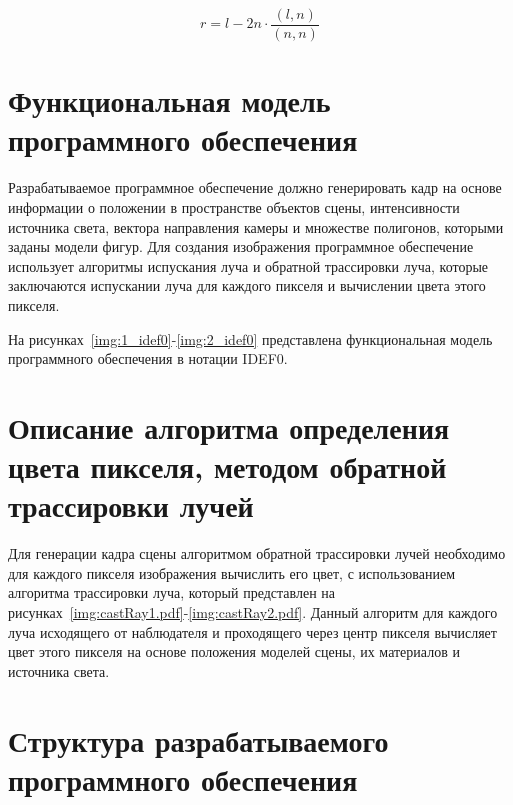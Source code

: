 \begin{equation}
	\label{reflect_ray}
	r = l - 2 n \cdot \frac{(l, n)}{(n, n)}
\end{equation}

\clearpage
\section{Функциональная модель программного обеспечения}

Разрабатываемое программное обеспечение должно генерировать кадр на основе информации о положении в пространстве объектов сцены, интенсивности источника света, вектора направления камеры и множестве полигонов, которыми заданы модели фигур. Для создания изображения программное обеспечение использует алгоритмы испускания луча и обратной трассировки луча, которые заключаются испускании луча для каждого пикселя и вычислении цвета этого пикселя.

На рисунках~\ref{img:1_idef0}-\ref{img:2_idef0} представлена функциональная модель программного обеспечения в нотации IDEF0.

\FloatBarrier
{}
\FloatBarrier
{}
\FloatBarrier

\clearpage
\section{Описание алгоритма определения цвета пикселя, методом обратной трассировки лучей}

Для генерации кадра сцены алгоритмом обратной трассировки лучей необходимо для каждого пикселя изображения вычислить его цвет, с использованием алгоритма трассировки луча, который представлен на рисунках~\ref{img:castRay1.pdf}-\ref{img:castRay2.pdf}. Данный алгоритм для каждого луча исходящего от наблюдателя и проходящего через центр пикселя вычисляет цвет этого пикселя на основе положения моделей сцены, их материалов и источника света.

\FloatBarrier
{}
\FloatBarrier
{}
\FloatBarrier

\clearpage
\section{Структура разрабатываемого программного обеспечения}

